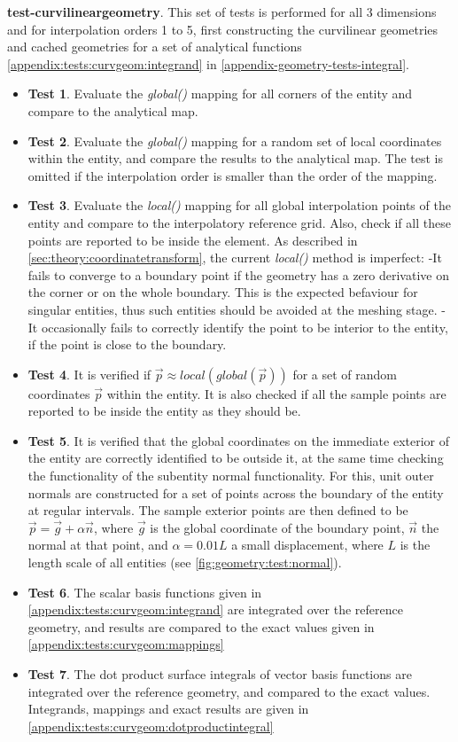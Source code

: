 \noindent
\textbf{test-curvilineargeometry}. This set of tests is performed for all 3 dimensions and for interpolation orders 1 to 5, first constructing the curvilinear geometries and cached geometries for a set of analytical functions \cref{appendix:tests:curvgeom:integrand} in \cref{appendix-geometry-tests-integral}.
\begin{itemize}
	\item \textbf{Test 1}. Evaluate the \textit{global()} mapping for all corners of the entity and compare to the analytical map.
	\item \textbf{Test 2}. Evaluate the \textit{global()} mapping for a random set of local coordinates within the entity, and compare the results to the analytical map. The test is omitted if the interpolation order is smaller than the order of the mapping.
	\item \textbf{Test 3}. Evaluate the \textit{local()} mapping for all global interpolation points of the entity and compare to the interpolatory reference grid. Also, check if all these points are reported to be inside the element. As described in \cref{sec:theory:coordinatetransform}, the current \textit{local()} method is imperfect:
		\subitem -It fails to converge to a boundary point if the geometry has a zero derivative on the corner or on the whole boundary. This is the expected befaviour for singular entities, thus such entities should be avoided at the meshing stage.
		\subitem -It occasionally fails to correctly identify the point to be interior to the entity, if the point is close to the boundary.
	\item \textbf{Test 4}. It is verified if $\vec{p} \approx local(global(\vec{p}))$ for a set of random coordinates $\vec{p}$ within the entity. It is also checked if all the sample points are reported to be inside the entity as they should be.
	\item \textbf{Test 5}. It is verified that the global coordinates on the immediate exterior of the entity are correctly identified to be outside it, at the same time checking the functionality of the subentity normal functionality. For this, unit outer normals are constructed for a set of points across the boundary of the entity at regular intervals. The sample exterior points are then defined to be $\vec{p} = \vec{g} + \alpha \vec{n}$, where $\vec{g}$ is the global coordinate of the boundary point, $\vec{n}$ the normal at that point, and $\alpha = 0.01 L$ a small displacement, where $L$ is the length scale of all entities (see \cref{fig:geometry:test:normal}).
	\item \textbf{Test 6}. The scalar basis functions given in \cref{appendix:tests:curvgeom:integrand} are integrated over the reference geometry, and results are compared to the exact values given in \cref{appendix:tests:curvgeom:mappings}
	\item \textbf{Test 7}. The dot product surface integrals of vector basis functions are integrated over the reference geometry, and compared to  the exact values. Integrands, mappings and exact results are given in \cref{appendix:tests:curvgeom:dotproductintegral}
\end{itemize}

